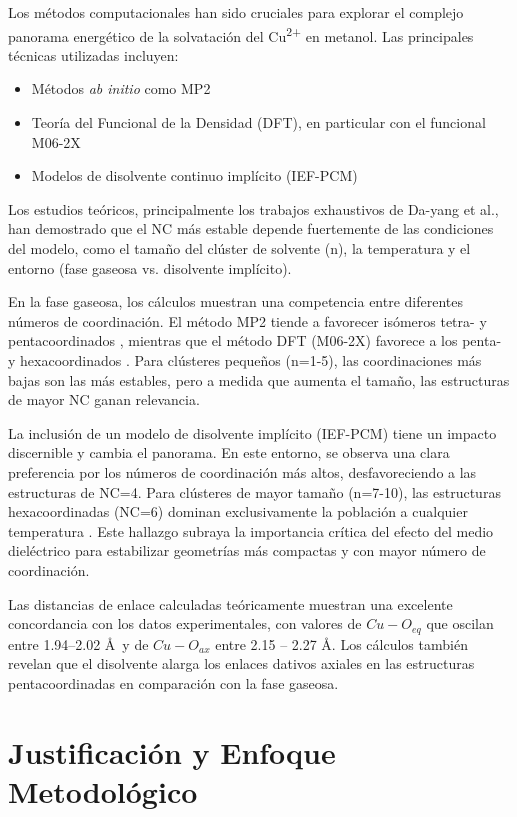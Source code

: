 Los métodos computacionales han sido cruciales para explorar el complejo panorama energético de la solvatación del Cu\textsuperscript{2+} en metanol. Las principales técnicas utilizadas incluyen:
\begin{itemize}
    \item Métodos \textit{ab initio} como MP2 
    \item Teoría del Funcional de la Densidad (DFT), en particular con el funcional M06-2X
    \item Modelos de disolvente continuo implícito (IEF-PCM)
\end{itemize}

Los estudios teóricos, principalmente los trabajos exhaustivos de Da-yang et al., han demostrado que el NC más estable depende fuertemente de las condiciones del modelo, como el tamaño del clúster de solvente (n), la temperatura y el entorno (fase gaseosa vs. disolvente implícito).

En la fase gaseosa, los cálculos muestran una competencia entre diferentes números de coordinación. El método MP2 tiende a favorecer isómeros tetra- y pentacoordinados \cite{Me-2022-01}, mientras que el método DFT (M06-2X) favorece a los penta- y hexacoordinados \cite{Me-2023-01}. Para clústeres pequeños (n=1-5), las coordinaciones más bajas son las más estables, pero a medida que aumenta el tamaño, las estructuras de mayor NC ganan relevancia.

La inclusión de un modelo de disolvente implícito (IEF-PCM) tiene un impacto discernible y cambia el panorama. En este entorno, se observa una clara preferencia por los números de coordinación más altos, desfavoreciendo a las estructuras de NC=4. Para clústeres de mayor tamaño (n=7-10), las estructuras hexacoordinadas (NC=6) dominan exclusivamente la población a cualquier temperatura \cite{Me-2023-02}. Este hallazgo subraya la importancia crítica del efecto del medio dieléctrico para estabilizar geometrías más compactas y con mayor número de coordinación.

Las distancias de enlace calculadas teóricamente muestran una excelente concordancia con los datos experimentales, con valores de $Cu-O_{eq}$ que oscilan entre 1.94--2.02 \AA \ y de $Cu-O_{ax}$ entre 2.15 -- 2.27 \AA. Los cálculos también revelan que el disolvente alarga los enlaces dativos axiales en las estructuras pentacoordinadas en comparación con la fase gaseosa.



\section{Justificación y Enfoque Metodológico}

